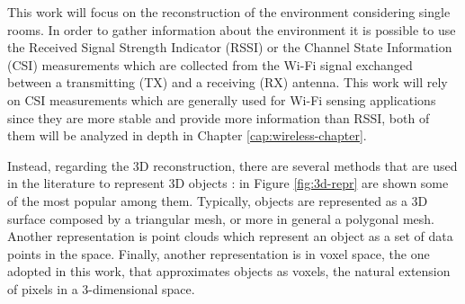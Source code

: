 \documentclass[binding=0.6cm,noexaminfo]{sapthesis}
\begin{document}
This work will focus on the reconstruction of the environment considering single rooms. In order to gather information about the environment it is possible to use the Received Signal Strength Indicator (RSSI) or the Channel State Information (CSI) measurements \cite{tool-release} which are collected from the Wi-Fi signal exchanged between a transmitting (TX) and a receiving (RX) antenna. This work will rely on CSI measurements which are generally used for Wi-Fi sensing applications since they are more stable and provide more information than RSSI, both of them will be analyzed in depth in Chapter \ref{cap:wireless-chapter}.

Instead, regarding the 3D reconstruction, there are several methods that are used in the literature to represent 3D objects \cite{3d-repr-survey}: in Figure \ref{fig:3d-repr} are shown some of the most popular among them. Typically, objects are represented as a 3D surface composed by a triangular mesh, or more in general a polygonal mesh. Another representation is point clouds which represent an object as a set of data points in the space. Finally, another representation is in voxel space, the one adopted in this work, that approximates objects as voxels, the natural extension of pixels in a 3-dimensional space.
\end{document}
